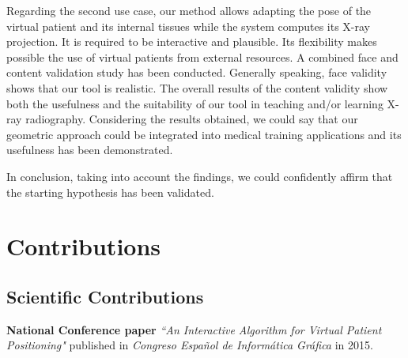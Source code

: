 Regarding the second use case, %
our method allows adapting the pose of the virtual patient and its internal tissues while the system computes its X-ray projection. It is required to be interactive and plausible. Its flexibility makes possible the use of virtual patients from external resources.
A combined face and content validation study has been conducted. Generally speaking, face validity shows that our tool is realistic. The overall results of the content validity show both the usefulness and the suitability of our tool in teaching and/or learning X-ray radiography. %
Considering the results obtained, we could say that our geometric approach could be integrated into medical training applications and its usefulness has been demonstrated.

In conclusion, taking into account the findings, we could confidently affirm that the starting hypothesis has been validated.




\section{Contributions}
\subsection{Scientific Contributions}
\label{conclu:cientifica}

\textbf{National Conference paper } \emph{``An Interactive Algorithm for Virtual Patient Positioning"} \cite{ceig.20151197} published in \emph{Congreso Español de Informática Gráfica} in 2015. 

